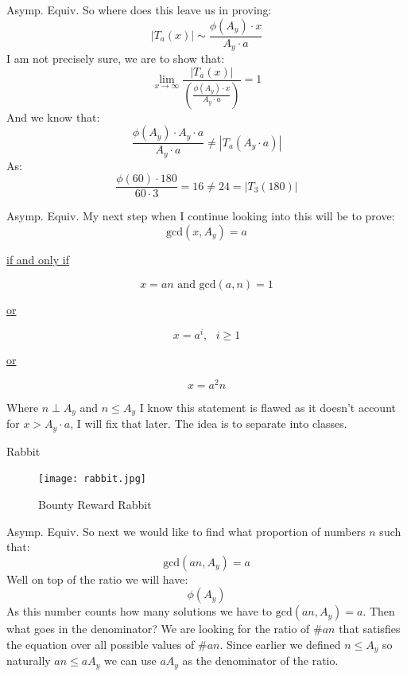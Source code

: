 \documentclass{beamer}
\begin{document}
\begin{frame}{Asymp. Equiv.}
    So where does this leave us in proving:
    $$|T_a(x)|  \sim  \frac{\phi(A_y) \cdot x}{ A_y \cdot a}$$
    I am not precisely sure, we are to show that:
    $$\lim_{x \to \infty} \frac{|T_a(x)|}{\left(\frac{\phi(A_y) \cdot x}{ A_y \cdot a}\right)} =1$$
    And we know that: $$\frac{\phi(A_y) \cdot A_y \cdot a}{ A_y \cdot a} \neq |T_a(A_y \cdot a)|$$
    As: $$\frac{\phi(60) \cdot 180}{ 60 \cdot 3} = 16 \neq  24 = |T_3(180)|$$
\end{frame}

\begin{frame}{Asymp. Equiv.}
    My next step when I continue looking into this will be to prove:$$\text{gcd}(x, A_y) = a $$
     \begin{center}
        \underline{if and only if}
    \end{center}
    $$x = an \text{ and } \text{gcd}(a, n ) = 1$$
    \begin{center}
        \underline{or}
    \end{center}
    $$x = a^i, \text{ } i \geq 1$$
    \begin{center}
        \underline{or}
    \end{center}
    $$x = a^2n$$
    
    Where $n \perp A_y$ and $n \leq A_y$ \linebreak \linebreak
    I know this statement is flawed as it doesn't account for $x > A_y \cdot a$, I will fix that later. The idea is to separate into classes.
\end{frame}

\begin{frame}{Rabbit}
     \begin{figure}[h]
     \centering
     \texttt{[image: rabbit.jpg]}
    \caption{Bounty Reward Rabbit}       
    \end{figure}
\end{frame}


\begin{frame}{Asymp. Equiv.}
So next we would like to find what proportion of numbers $n$ such that:$$\text{gcd}(an, A_y) = a$$ 
Well on top of the ratio we will have: $$\phi(A_y)$$
As this number counts how many solutions we have to $\text{gcd}(an, A_y) = a$. Then what goes in the denominator? We are looking for the ratio of $\#an$ that satisfies the equation over all possible values of $\#an$. Since earlier we defined $n \leq A_y$ so naturally $an \leq aA_y$ we can use $aA_y$ as the denominator of the ratio. 
  
\end{frame}
\end{document}
